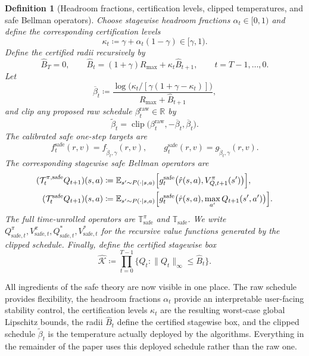 \documentclass{article}
\newtheorem{definition}[definition]{Definition}
\theoremstyle{remark}
\newcommand{\R}{\mathbb{R}}
\newcommand{\E}{\mathbb{E}}
\newcommand{\defeq}{\coloneqq}
\newcommand{\cT}{\mathcal{T}}
\DeclareMathOperator{\clip}{clip}
\newcommand{\safe}{\mathrm{safe}}
\newcommand{\Ksafe}{\widehat{\mathcal K}}
\newcommand{\betacap}{\overline\beta}
\newcommand{\Bhat}{\widehat B}
\begin{document}
\begin{definition}[Headroom fractions, certification levels, clipped temperatures, and safe Bellman operators]
\label{def:safe-calibration}
Choose stagewise headroom fractions $\alpha_t\in[0,1)$ and define the corresponding certification levels
\begin{equation}
\kappa_t \defeq \gamma + \alpha_t(1-\gamma) \in [\gamma,1).
\label{eq:kappa-from-alpha}
\end{equation}
Define the certified radii recursively by
\begin{equation}
\Bhat_T=0,
\qquad
\Bhat_t=(1+\gamma)R_{\max}+\kappa_t\Bhat_{t+1},
\qquad t=T-1,\dots,0.
\label{eq:safe-envelope-recursion}
\end{equation}
Let
\begin{equation}
\betacap_t
\defeq
\frac{\log\!\bigl(\kappa_t/[\gamma(1+\gamma-\kappa_t)]\bigr)}{R_{\max}+\Bhat_{t+1}},
\label{eq:beta-cap}
\end{equation}
and clip any proposed raw schedule $\beta_t^{\mathrm{raw}}\in\R$ by
\begin{equation}
\widetilde\beta_t = \clip\bigl(\beta_t^{\mathrm{raw}},-\betacap_t,\betacap_t\bigr).
\label{eq:beta-clip}
\end{equation}
The calibrated safe one-step targets are
\[
 f_t^{\safe}(r,v)=f_{\widetilde\beta_t,\gamma}(r,v),
 \qquad
 g_t^{\safe}(r,v)=g_{\widetilde\beta_t,\gamma}(r,v).
\]
The corresponding stagewise safe Bellman operators are
\begin{align}
(\cT_t^{\pi,\safe}Q_{t+1})(s,a)
&\defeq
\E_{s'\sim P(\cdot\mid s,a)}\Bigl[g_t^{\safe}\bigl(\hat r(s,a),V_{Q,t+1}^\pi(s')\bigr)\Bigr],
\label{eq:safe-policy-op}\\
(\cT_t^{\safe}Q_{t+1})(s,a)
&\defeq
\E_{s'\sim P(\cdot\mid s,a)}\Bigl[g_t^{\safe}\bigl(\hat r(s,a),\max_{a'}Q_{t+1}(s',a')\bigr)\Bigr].
\label{eq:safe-opt-op}
\end{align}
The full time-unrolled operators are $\mathbb T_\safe^\pi$ and $\mathbb T_\safe$.
We write $Q_{\safe,t}^\pi,V_{\safe,t}^\pi,Q_{\safe,t}^*,V_{\safe,t}^*$ for the recursive value functions generated by the clipped schedule.
Finally, define the certified stagewise box
\begin{equation}
\Ksafe \defeq \prod_{t=0}^{T-1}\{Q_t:\|Q_t\|_\infty\le \Bhat_t\}.
\label{eq:safe-box}
\end{equation}
\end{definition}

All ingredients of the safe theory are now visible in one place.
The raw schedule provides flexibility, the headroom fractions $\alpha_t$ provide an interpretable user-facing stability control, the certification levels $\kappa_t$ are the resulting worst-case global Lipschitz bounds, the radii $\Bhat_t$ define the certified stagewise box, and the clipped schedule $\widetilde\beta_t$ is the temperature actually deployed by the algorithms.
Everything in the remainder of the paper uses this deployed schedule rather than the raw one.
\end{document}
